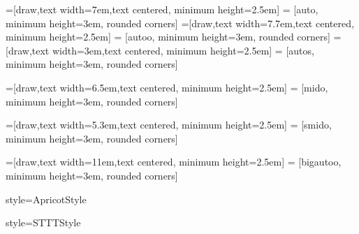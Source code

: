 \newtheorem{theorem_type}{Theorem}[section]
\newtheorem{theorem_def}[theorem_type]{定理\hspace*{0.5mm}}
\newcommand{\theorem}[1]{\begin{theorem_def}#1\end{theorem_def}}

\newtheorem{proposition_type}{Theorem}[section]
\newtheorem{proposition_def}[proposition_type]{命题\hspace*{0.5mm}}
\newcommand{\proposition}[1]{\begin{proposition_def}#1\end{proposition_def}}

\renewcommand{\algorithmcfname}{算法}
\renewcommand{\algorithmicrequire}{ \textbf{输入：}} %
\renewcommand{\algorithmicensure}{ \textbf{输出：}} %
=[draw,text width=7em,text centered, minimum height=2.5em]
 = [auto, minimum height=3em, rounded corners]
=[draw,text width=7.7em,text centered, minimum height=2.5em]
 = [autoo, minimum height=3em, rounded corners]
=[draw,text width=3em,text centered, minimum height=2.5em]
 = [autos, minimum height=3em, rounded corners]

=[draw,text width=6.5em,text centered, minimum height=2.5em]
 = [mido, minimum height=3em, rounded corners]

=[draw,text width=5.3em,text centered, minimum height=2.5em]
 = [smido, minimum height=3em, rounded corners]

=[draw,text width=11em,text centered, minimum height=2.5em]
 = [bigautoo, minimum height=3em, rounded corners]





 {style=ApricotStyle}


 {style=STTTStyle}

